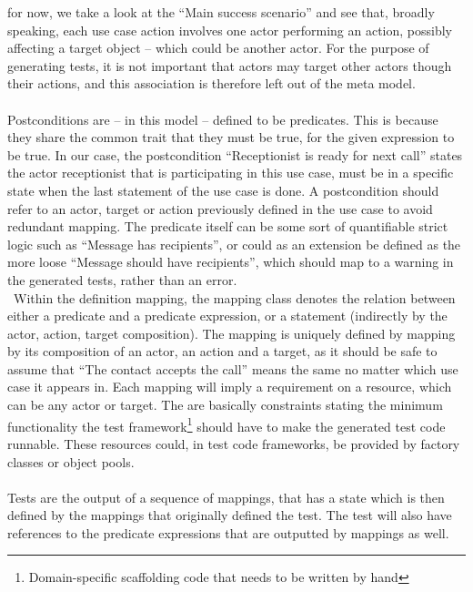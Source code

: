 

for now, we take a look at the ``Main success scenario'' and see that, broadly speaking, each use case action involves one actor performing an action, possibly affecting a target object -- which could be another actor. For the purpose of generating tests, it is not important that actors may target other actors though their actions, and this association is therefore left out of the meta model.\\\\
Postconditions are -- in this model -- defined to be predicates. This is because they share the common trait that they must be true, for the given expression to be true. In our case, the postcondition ``Receptionist is ready for next call'' states the actor receptionist that is participating in this use case, must be in a specific state when the last statement of the use case is done. A postcondition should refer to an actor, target or action previously defined in the use case to avoid redundant mapping. The predicate itself can be some sort of quantifiable strict logic such as ``Message has recipients'', or could as an extension be defined as the more loose ``Message should have recipients'', which should map to a warning in the generated tests, rather than an error.\\\
Within the definition mapping, the mapping class denotes the relation between either a predicate and a predicate expression, or a statement (indirectly by the actor, action, target composition). The mapping is uniquely defined by mapping by its composition of an actor, an action and a target, as it should be safe to assume that ``The contact accepts the call'' means the same no matter which use case it appears in. Each mapping will imply a requirement on a resource, which can be any actor or target. The are basically constraints stating the minimum functionality the test framework\footnote{Domain-specific scaffolding code that needs to be written by hand} should have to make the generated test code runnable. These resources could, in test code frameworks, be provided by factory classes or object pools.\\\\
Tests are the output of a sequence of mappings, that has a state which is then defined by the mappings that originally defined the test. The test will also have references to the predicate expressions that are outputted by mappings as well.

